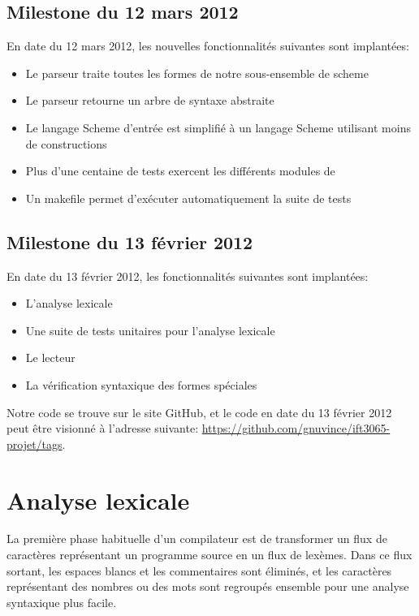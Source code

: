 \documentclass[11pt]{report}
\begin{document}
\section{Milestone du 12 mars 2012}

En date du 12 mars 2012,  les nouvelles fonctionnalités suivantes sont
implantées:
\begin{itemize}
\item Le parseur traite toutes les formes de notre sous-ensemble de scheme
\item Le parseur retourne un arbre de syntaxe abstraite
\item Le langage Scheme d'entrée est simplifié à un langage Scheme
  utilisant moins de constructions
\item Plus d'une centaine de tests exercent les différents modules de \sins{}
\item Un makefile permet d'exécuter automatiquement la suite de tests
\end{itemize}


\section{Milestone du 13 février 2012}

En date du 13 février 2012, les fonctionnalités suivantes sont
implantées:

\begin{itemize}
\item L'analyse lexicale
\item Une suite de tests unitaires pour l'analyse lexicale
\item Le lecteur
\item La vérification syntaxique des formes spéciales
\end{itemize}

Notre code se trouve sur le site GitHub, et le code en date du 13
février 2012 peut être visionné à l'adresse suivante:
\url{https://github.com/gnuvince/ift3065-projet/tags}.


\chapter{Analyse lexicale}

La première phase habituelle d'un compilateur est de transformer un
flux de caractères représentant un programme source en un flux de
lexèmes.  Dans ce flux sortant, les espaces blancs et les commentaires
sont éliminés, et les caractères représentant des nombres ou des mots
sont regroupés ensemble pour une analyse syntaxique plus facile.
\end{document}
